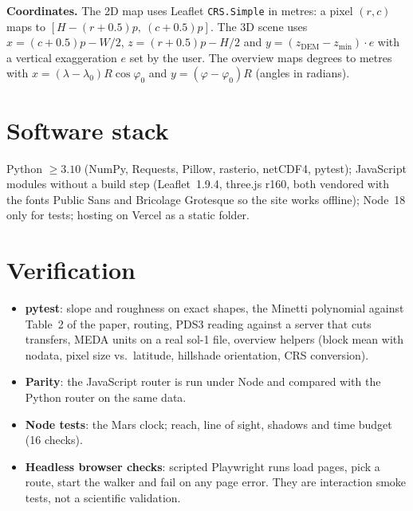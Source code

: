\documentclass[11pt,a4paper]{article}
\renewcommand{\_}{\textunderscore\allowbreak}
\newcommand{\code}[1]{\texttt{#1}}
\begin{document}
\textbf{Coordinates.} The 2D map uses Leaflet \code{CRS.Simple} in metres: a pixel $(r,c)$ maps to $[H-(r+0.5)p,\ (c+0.5)p]$. The 3D scene uses $x=(c+0.5)p-W/2$, $z=(r+0.5)p-H/2$ and $y=(z_\text{DEM}-z_\text{min})\cdot e$ with a vertical exaggeration $e$ set by the user. The overview maps degrees to metres with $x=(\lambda-\lambda_0)R\cos\varphi_0$ and $y=(\varphi-\varphi_0)R$ (angles in radians).

\section{Software stack}
Python $\ge3.10$ (NumPy, Requests, Pillow, rasterio, netCDF4, pytest); JavaScript modules without a build step (Leaflet~1.9.4, three.js r160, both vendored with the fonts Public Sans and Bricolage Grotesque so the site works offline); Node~18 only for tests; hosting on Vercel as a static folder.

\section{Verification}
\begin{itemize}
\item \textbf{pytest}: slope and roughness on exact shapes, the Minetti polynomial against Table~2 of the paper, routing, PDS3 reading against a server that cuts transfers, MEDA units on a real sol-1 file, overview helpers (block mean with nodata, pixel size vs.\ latitude, hillshade orientation, CRS conversion).
\item \textbf{Parity}: the JavaScript router is run under Node and compared with the Python router on the same data.
\item \textbf{Node tests}: the Mars clock; reach, line of sight, shadows and time budget (16 checks).
\item \textbf{Headless browser checks}: scripted Playwright runs load pages, pick a route, start the walker and fail on any page error. They are interaction smoke tests, not a scientific validation.
\end{itemize}
\end{document}
